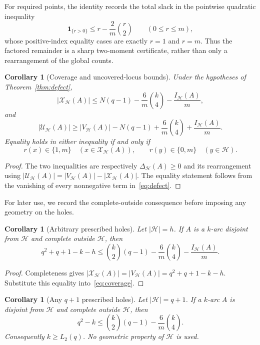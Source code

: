 \documentclass[11pt]{article}
\newtheorem{corollary}[theorem]{Corollary}
\theoremstyle{definition}
\theoremstyle{remark}
\newcommand{\cH}{\mathcal{H}}
\newcommand{\cU}{\mathcal{U}}
\newcommand{\cX}{\mathcal{X}}
\newcommand{\IH}{I_{\cH}}
\begin{document}
For required points, the identity records the total slack in the
pointwise quadratic inequality
\[
 \mathbf 1_{\{r>0\}}\le r-\frac2m\binom r2
 \qquad(0\le r\le m),
\]
whose positive-index equality cases are exactly \(r=1\) and \(r=m\).
Thus the factored remainder is a sharp two-moment certificate, rather than
only a rearrangement of the global counts.

\begin{corollary}[Coverage and uncovered-locus bounds]
\label{cor:coverage}
Under the hypotheses of Theorem~\ref{thm:defect},
\begin{equation}
 |\cX_{\cH}(A)|\le
 N(q-1)-\frac{6}{m}\binom{k}{4}-\frac{\IH(A)}m,
\label{eq:coverage}
\end{equation}
and
\begin{equation}
 |\cU_{\cH}(A)|\ge
 |V_{\cH}(A)|-N(q-1)
 +\frac{6}{m}\binom{k}{4}+\frac{\IH(A)}m.
\label{eq:uncovered}
\end{equation}
Equality holds in either inequality if and only if
\[
 r(x)\in\{1,m\}\quad(x\in\cX_{\cH}(A)),
 \qquad
 r(y)\in\{0,m\}\quad(y\in\cH).
\]
\end{corollary}

\begin{proof}
The two inequalities are respectively $\Delta_{\cH}(A)\ge0$ and its
rearrangement using
$|\cU_{\cH}(A)|=|V_{\cH}(A)|-|\cX_{\cH}(A)|$.
The equality statement follows from the vanishing of every nonnegative term
in~\eqref{eq:defect}.
\end{proof}

For later use, we record the complete-outside consequence before imposing
any geometry on the holes.

\begin{corollary}[Arbitrary prescribed holes]
\label{cor:arbitrary-holes}
Let $|\cH|=h$.  If $A$ is a $k$-arc disjoint from $\cH$ and complete outside
$\cH$, then
\begin{equation}
 q^2+q+1-k-h\le
 \binom{k}{2}(q-1)-\frac6m\binom{k}{4}-\frac{\IH(A)}m.
\label{eq:arbitrary-holes}
\end{equation}
\end{corollary}

\begin{proof}
Completeness gives
$|\cX_{\cH}(A)|=|V_{\cH}(A)|=q^2+q+1-k-h$.
Substitute this equality into~\eqref{eq:coverage}.
\end{proof}

\begin{corollary}[Any \(q+1\) prescribed holes]
\label{cor:q-plus-one-holes}
Let \(|\cH|=q+1\).  If a \(k\)-arc \(A\) is disjoint from \(\cH\) and
complete outside \(\cH\), then
\[
 q^2-k\le
 \binom{k}{2}(q-1)-\frac6m\binom{k}{4}.
\]
Consequently \(k\ge L_2(q)\).  No geometric property of \(\cH\) is used.
\end{corollary}
\end{document}
